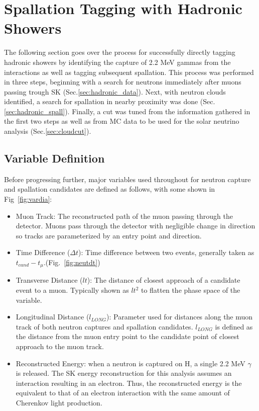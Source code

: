 \section{Spallation Tagging with Hadronic Showers}
\label{sec:neutspall}
The following section goes over the process for successfully directly tagging hadronic showers by identifying the capture of 2.2 MeV gammas from the interactions as well as tagging subsequent spallation. This process was performed in three steps, beginning with a search for neutrons immediately after muons passing trough SK (Sec.\ref{sec:hadronic_data}). Next, with neutron clouds identified, a search for spallation in nearby proximity was done (Sec.\ref{sec:hadronic_spall}). Finally, a cut was tuned from the information gathered in the first two steps as well as from MC data to be used for the solar neutrino analysis (Sec.\ref{sec:cloudcut}). 

\subsection{Variable Definition}
\label{sec:vardef}
Before progressing further, major variables used throughout for neutron capture and spallation candidates are defined as follows, with some shown in Fig~\ref{fig:vardia}:
\begin{itemize}
    \item Muon Track: The reconstructed path of the muon passing through the detector. Muons pass through the detector with negligible change in direction so tracks are parameterized by an entry point and direction. 
    \item Time Difference ($\Delta t$): Time difference between two events, generally taken as $t_{cand} - t_\mu$.(Fig.~\ref{fig:neutdt})
    \item Transverse Distance ($lt$): The distance of closest approach of a candidate event to a muon. Typically shown as $lt^2$ to flatten the phase space of the variable. 
    \item Longitudinal Distance ($l_{LONG}$): Parameter used for distances along the muon track of both neutron captures and spallation candidates. $l_{LONG}$ is defined as the distance from the muon entry point to the candidate point of closest approach to the muon track.
    \item Reconstructed Energy: when a neutron is captured on H, a single 2.2 MeV $\gamma$ is released. The SK energy reconstruction for this analysis assumes an interaction resulting in an electron. Thus, the reconstructed energy is the equivalent to that of an electron interaction with the same amount of Cherenkov light production.
    
\end{itemize}

